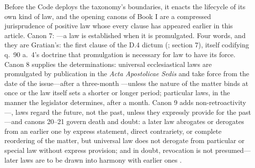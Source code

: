 Before the Code deploys the taxonomy's boundaries, it enacts the lifecycle of its own kind of law, and the opening canons of Book I are a compressed jurisprudence of positive law whose every clause has appeared earlier in this article. Canon 7: ---a law is established when it is promulgated. Four words, and they are Gratian's: the first clause of the D.4 dictum (; section 7), itself codifying q.~90 a.~4's doctrine that promulgation is necessary for law to have its force. Canon 8 supplies the determinations: universal ecclesiastical laws are promulgated by publication in the \emph{Acta Apostolicae Sedis} and take force  from the date of the issue---after a three-month ---unless the nature of the matter binds at once or the law itself sets a shorter or longer period; particular laws, in the manner the legislator determines, after a month. Canon 9 adds non-retroactivity---, laws regard the future, not the past, unless they expressly provide for the past---and canons 20--21 govern death and doubt: a later law abrogates or derogates from an earlier one by express statement, direct contrariety, or complete reordering of the matter, but universal law does not derogate from particular or special law without express provision; and in doubt, revocation is not presumed---later laws are to be drawn into harmony with earlier ones .

